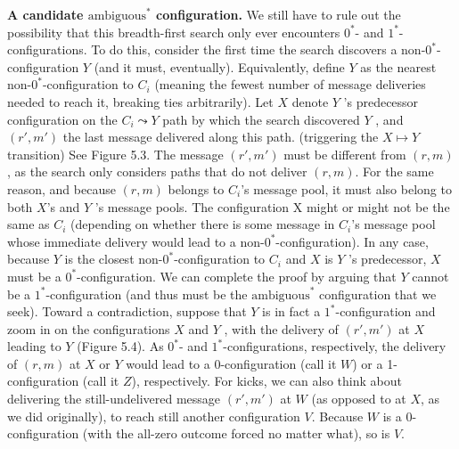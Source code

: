 \noindent
\textbf{A candidate $\text{ambiguous}^*$ configuration.} We still have to rule out the possibility that
this breadth-first search only ever encounters $0^*$- and $1^*$-configurations. To do this, consider the first time the search discovers a non-$0^*$-configuration $Y$ (and it must, eventually). Equivalently, define $Y$ as the nearest non-$0^*$-configuration to $C_i$ (meaning the fewest number of message deliveries needed to reach it, breaking ties arbitrarily). Let $X$ denote $Y$ ’s predecessor configuration on the $C_i \leadsto Y$ path by which the search discovered $Y$ , and $(r', m')$ the
last message delivered along this path. (triggering the $X \longmapsto Y$ transition) See Figure 5.3. The
message $(r', m')$ must be different from $(r, m)$, as the search only considers paths that do not
deliver $(r, m)$. For the same reason, and because $(r, m)$ belongs to $C_i$’s message pool, it must also belong to both $X$’s and $Y$ ’s message pools. The configuration X might or might not be the same as $C_i$ (depending on whether there is some message in $C_i$’s message pool whose
immediate delivery would lead to a non-$0^*$-configuration). In any case, because $Y$ is the
closest non-$0^*$-configuration to $C_i$ and $X$ is $Y$ ’s predecessor, $X$ must be a $0^*$-configuration.
We can complete the proof by arguing that $Y$ cannot be a $1^*$-configuration (and thus must be the $\text{ambiguous}^*$ configuration that we seek). Toward a contradiction, suppose that
$Y$ is in fact a $1^*$-configuration and zoom in on the configurations $X$ and $Y$ , with the delivery
of $(r', m')$ at $X$ leading to $Y$ (Figure 5.4). As $0^*$- and $1^*$-configurations, respectively, the
delivery of $(r, m)$ at $X$ or $Y$ would lead to a 0-configuration (call it $W$) or a 1-configuration
(call it $Z$), respectively. For kicks, we can also think about delivering the still-undelivered
message $(r', m')$ at $W$ (as opposed to at $X$, as we did originally), to reach still another
configuration $V$. Because $W$ is a 0-configuration (with the all-zero outcome forced no matter
what), so is $V$.\\

